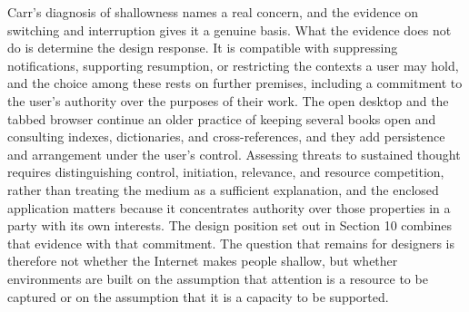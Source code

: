 \documentclass[12pt]{article}
\begin{document}
Carr's diagnosis of shallowness names a real concern, and the evidence on switching and interruption gives it a genuine basis. What the evidence does not do is determine the design response. It is compatible with suppressing notifications, supporting resumption, or restricting the contexts a user may hold, and the choice among these rests on further premises, including a commitment to the user's authority over the purposes of their work. The open desktop and the tabbed browser continue an older practice of keeping several books open and consulting indexes, dictionaries, and cross-references, and they add persistence and arrangement under the user's control. Assessing threats to sustained thought requires distinguishing control, initiation, relevance, and resource competition, rather than treating the medium as a sufficient explanation, and the enclosed application matters because it concentrates authority over those properties in a party with its own interests. The design position set out in Section 10 combines that evidence with that commitment. The question that remains for designers is therefore not whether the Internet makes people shallow, but whether environments are built on the assumption that attention is a resource to be captured or on the assumption that it is a capacity to be supported.
\end{document}
